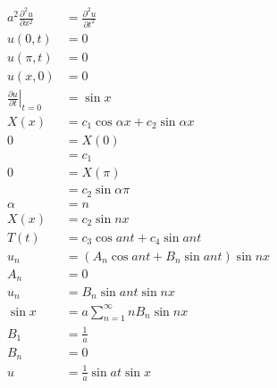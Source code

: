 \documentclass{article}
\begin{document}
\setcounter{subsubsection}{2}
\subsubsection{}

\begin{align*}
  a^2 \frac{\partial^2 u}{\partial x^2}                & = \frac{\partial^2 u}{\partial t^2}          \\
  u(0, t)                                              & = 0                                          \\
  u(\pi, t)                                            & = 0                                          \\
  u(x, 0)                                              & = 0                                          \\
  \left. \frac{\partial u}{\partial t} \right|_{t = 0} & = \sin x                                     \\
  X(x)                                                 & = c_1 \cos \alpha x + c_2 \sin \alpha x      \\
  0                                                    & = X(0)                                       \\
                                                       & = c_1                                        \\
  0                                                    & = X(\pi)                                     \\
                                                       & = c_2 \sin \alpha \pi                        \\
  \alpha                                               & = n                                          \\
  X(x)                                                 & = c_2 \sin n x                               \\
  T(t)                                                 & = c_3 \cos a n t + c_4 \sin a n t            \\
  u_n                                                  & = (A_n \cos a n t + B_n \sin a n t) \sin n x \\
  A_n                                                  & = 0                                          \\
  u_n                                                  & = B_n \sin a n t \sin n x                    \\
  \sin x                                               & = a \sum_{n = 1}^\infty n B_n \sin n x       \\
  B_1                                                  & = \frac{1}{a}                                \\
  B_n                                                  & = 0                                          \\
  u                                                    & = \frac{1}{a} \sin a t \sin x
\end{align*}
\end{document}
